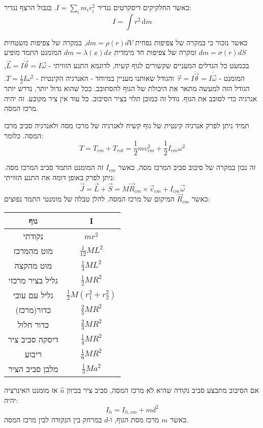 \documentclass{tstextbook}
\begin{document}
\begin{definition}
כאשר החלקיקים דיסקרטים נגדיר \(I=\sum_{i}m_{i}r_{i}^{2}\). בגבול הרצף נגדיר:
$$I=\int r^2 \, \mathrm{d}m $$

\end{definition}
כאשר נזכור כי במקרה של צפיפות נפחית \(dm=\rho(r)dV\), במקרה של צפיפות משטחית \(dm=\sigma(r)dS\) ומקרה של צפיפות חד מימדית \(dm=\lambda(x)dx\)
המומנט התמד מופיע בכמעט כל הגדלים המעניים שקשורים לגוף קשיח, לדוגמא התנע הזוויתי - \(\vec{L}=I \dot{\vec{\theta}}=I\vec{\omega}\), המומנט - \(\vec{\tau}=I \ddot{\vec{\theta}}=I \dot{\vec{\omega}}\) והגודל שאותנו מעניין במיוחד - האנרגיה הקינטית - \(T =\frac{1}{2}I\omega^2\). הגודל הזה למעשה מתאר את היכולת של הגוף להסתובב. ככל שהוא גדול יותר, נדרש יותר אנרגיה כדי לסובב את הגוף. גודל זה כמובן תלוי בציר הסיבוב. כל עוד אין ציר מקובע. זה יהיה מרכז המסה.

\begin{theorem}
תמיד ניתן לפרק אנרגיה קינטית של גוף קשיח לאנרגיה של מרכז מסה ולאנרגיה סביב מרכז המסה. כלומר:
$$T=T_{c m}+T_{r o t}=\frac12m v_{c m}^{2}+\frac12I_{c m}{\omega}^{2}$$

\end{theorem}
זה נכון במקרה של סיבוב סביב המרכז מסה, כאשר \(I_{cm}\) זה המומנט התמד סביב המרכז מסה. ניתן לפרק באופן דומה את התנע הזוויתי:
$$\vec{J}=\vec{L}+\vec{S}=M\vec{R}_{c m}\times\vec{v}_{c m}+I_{c m}\vec{\omega}$$
כאשר \(\vec{R}_{cm}\) המיקום של מרכז המסה.
להלן טבלה של מומנטי התמד נפוצים:

\begin{table}[htbp]
  \centering
  \begin{tabular}{|cc|}
    \hline
    גוף & I \\ \hline
    נקודתי & \(mr^2\) \\ \hline
    מוט מהמרכז & \(\frac{1}{12}ML^2\) \\ \hline
    מוט מהקצה & \(\frac{1}{3}ML^2\) \\ \hline
    גליל בציר מרכזי & \(\frac{1}{2}MR^2\) \\ \hline
    גליל עם עובי & \(\frac{1}{2}M(r_1^2+r_2^2)\) \\ \hline
    כדור(מרכז) & \(\frac{2}{5}MR^2\) \\ \hline
    כדור חלול & \(\frac{2}{3}MR^2\) \\ \hline
    דיסקה סביב ציר & \(\frac{1}{4} MR^2\) \\ \hline
    ריבוע & \(\frac{1}{6}MR^2\) \\ \hline
    מלבן סביב הציר & \(\frac{1}{3}Ma^2\) \\ \hline
  \end{tabular}
\end{table}
\begin{theorem}[שטייניר]
אם הסיבוב מתבצע סביב נקודה שהיא לא מרכז המסה, סביב ציר בכיוון \(\hat{n}\) אז מומנט האינרציה יהיה:
$$I_{\hat{n}}=I_{\hat{n},c m}+m d^{2}$$
כאשר \(m\) מרכז מסת הגוף, ו-\(d\) במרחק בין הנקודה לבין מרכז המסה.

\end{theorem}
\end{document}
